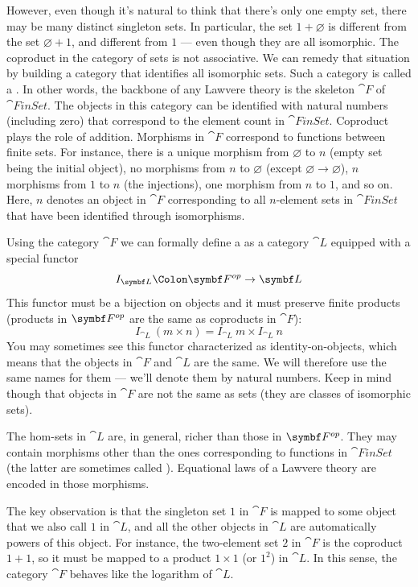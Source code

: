 However, even though it's natural to think that there's only one empty
set, there may be many distinct singleton sets. In particular, the set
$1 + \varnothing$ is different from the set $\varnothing + 1$, and
different from $1$ --- even though they are all isomorphic. The
coproduct in the category of sets is not associative. We can remedy that
situation by building a category that identifies all isomorphic sets.
Such a category is called a . In other words, the
backbone of any Lawvere theory is the skeleton $\cat{F}$ of
$\cat{FinSet}$. The objects in this category can be identified with
natural numbers (including zero) that correspond to the element count in
$\cat{FinSet}$. Coproduct plays the role of addition. Morphisms in
$\cat{F}$ correspond to functions between finite sets. For instance,
there is a unique morphism from $\varnothing$ to $n$ (empty set
being the initial object), no morphisms from $n$ to $\varnothing$
(except $\varnothing \to \varnothing$), $n$ morphisms from $1$ to
$n$ (the injections), one morphism from $n$ to $1$,
and so on. Here, $n$ denotes an object in $\cat{F}$
corresponding to all $n$-element sets in $\cat{FinSet}$ that have been
identified through isomorphisms.

Using the category $\cat{F}$ we can formally define a  as a category $\cat{L}$ equipped with a special functor
\[I_{\cat{L}} \Colon \Fop \to \cat{L}\]
This functor must be a bijection on objects and it must preserve finite
products (products in $\Fop$ are the same as
coproducts in $\cat{F}$):
\[I_{\cat{L}}\ (m\times{}n) = I_{\cat{L}}\ m\times{}I_{\cat{L}}\ n\]
You may sometimes see this functor characterized as identity-on-objects,
which means that the objects in $\cat{F}$ and $\cat{L}$ are the same.
We will therefore use the same names for them --- we'll denote them by
natural numbers. Keep in mind though that objects in $\cat{F}$ are not
the same as sets (they are classes of isomorphic sets).

The hom-sets in $\cat{L}$ are, in general, richer than those in
$\Fop$. They may contain morphisms other than
the ones corresponding to functions in $\cat{FinSet}$ (the latter are
sometimes called ). Equational laws of a
Lawvere theory are encoded in those morphisms.

The key observation is that the singleton set $1$ in $\cat{F}$
is mapped to some object that we also call $1$ in $\cat{L}$, and
all the other objects in $\cat{L}$ are automatically powers of this
object. For instance, the two-element set $2$ in $\cat{F}$ is
the coproduct $1 + 1$, so it must be mapped to a product
$1 \times 1$ (or $1^2$) in $\cat{L}$. In this sense, the category
$\cat{F}$ behaves like the logarithm of $\cat{L}$.


